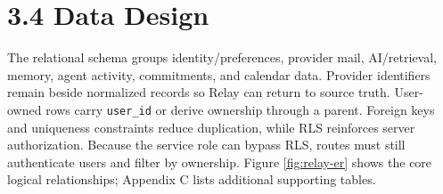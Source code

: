 \documentclass[
]{report}
\begin{document}
\section{3.4 Data Design}\label{34-data-design}

The relational schema groups identity/preferences, provider mail,
AI/retrieval, memory, agent activity, commitments, and calendar data.
Provider identifiers remain beside normalized records so Relay can
return to source truth. User-owned rows carry \texttt{user\_id} or
derive ownership through a parent. Foreign keys and uniqueness
constraints reduce duplication, while RLS reinforces server
authorization. Because the service role can bypass RLS, routes must
still authenticate users and filter by ownership. Figure
\ref{fig:relay-er} shows the core logical relationships; Appendix C lists
additional supporting tables.
\end{document}
